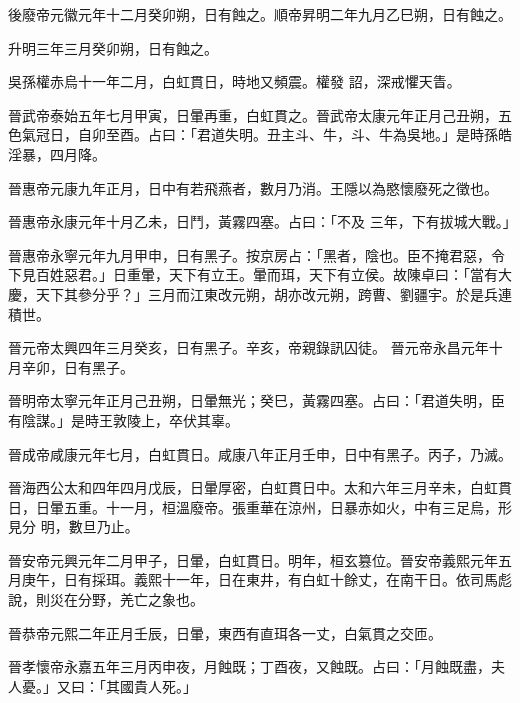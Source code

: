 \begin{pinyinscope}
 後廢帝元徽元年十二月癸卯朔，日有蝕之。順帝昇明二年九月乙巳朔，日有蝕之。



 升明三年三月癸卯朔，日有蝕之。



 吳孫權赤烏十一年二月，白虹貫日，時地又頻震。權發
 詔，深戒懼天眚。



 晉武帝泰始五年七月甲寅，日暈再重，白虹貫之。晉武帝太康元年正月己丑朔，五色氣冠日，自卯至酉。占曰：「君道失明。丑主斗、牛，斗、牛為吳地。」是時孫皓淫暴，四月降。



 晉惠帝元康九年正月，日中有若飛燕者，數月乃消。王隱以為愍懷廢死之徵也。



 晉惠帝永康元年十月乙未，日鬥，黃霧四塞。占曰：「不及
 三年，下有拔城大戰。」



 晉惠帝永寧元年九月甲申，日有黑子。按京房占：「黑者，陰也。臣不掩君惡，令下見百姓惡君。」日重暈，天下有立王。暈而珥，天下有立侯。故陳卓曰：「當有大慶，天下其參分乎？」三月而江東改元朔，胡亦改元朔，跨曹、劉疆宇。於是兵連積世。



 晉元帝太興四年三月癸亥，日有黑子。辛亥，帝親錄訊囚徒。
 晉元帝永昌元年十月辛卯，日有黑子。



 晉明帝太寧元年正月己丑朔，日暈無光；癸巳，黃霧四塞。占曰：「君道失明，臣有陰謀。」是時王敦陵上，卒伏其辜。



 晉成帝咸康元年七月，白虹貫日。咸康八年正月壬申，日中有黑子。丙子，乃滅。



 晉海西公太和四年四月戊辰，日暈厚密，白虹貫日中。太和六年三月辛未，白虹貫日，日暈五重。十一月，桓溫廢帝。張重華在涼州，日暴赤如火，中有三足烏，形見分
 明，數旦乃止。



 晉安帝元興元年二月甲子，日暈，白虹貫日。明年，桓玄篡位。晉安帝義熙元年五月庚午，日有採珥。義熙十一年，日在東井，有白虹十餘丈，在南干日。依司馬彪說，則災在分野，羌亡之象也。



 晉恭帝元熙二年正月壬辰，日暈，東西有直珥各一丈，白氣貫之交匝。



 晉孝懷帝永嘉五年三月丙申夜，月蝕既；丁酉夜，又蝕既。占曰：「月蝕既盡，夫人憂。」又曰：「其國貴人死。」




\end{pinyinscope}
